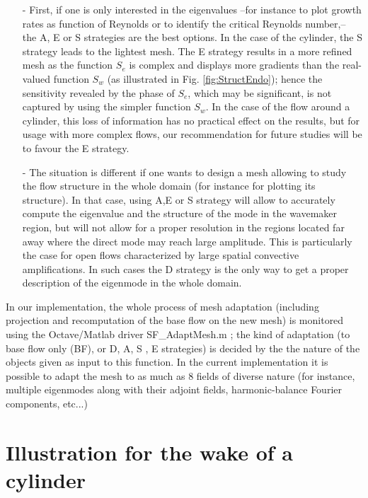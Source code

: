 \documentclass[twocolumn,10pt]{asme2ej}
\begin{document}
\begin{itemize}
\item[-] 
First, if one is only interested in the eigenvalues --for instance to plot growth rates as function of Reynolds or to identify the critical Reynolds number,-- the A, E or S strategies are the best options. In the case of the cylinder, the S strategy leads to the lightest mesh. The E strategy results in a more refined mesh as the function $S_e$ is complex and displays more gradients than the real-valued function $S_w$ (as illustrated in Fig. \ref{fig:StructEndo}); hence the sensitivity revealed by the phase of $S_e$, which may be significant, is not captured by using the simpler function $S_w$. In the case of the flow around a cylinder,  this loss of information has no practical effect on the results, but for usage with more complex flows, our recommendation for future studies will be to favour the E strategy.
\item[-] 
The situation is different if one wants to design a mesh allowing to study the flow structure in the whole domain (for instance for plotting its structure). In that case, using A,E or S strategy will allow to accurately compute the eigenvalue and the structure of the mode in the wavemaker region, but will not allow for a proper resolution in the regions located far away where the direct mode may reach large amplitude. This is particularly the case for open flows characterized by large spatial convective amplifications. In such cases the D strategy is the only way to get a proper description of the eigenmode in the whole domain.
\end{itemize}

In our implementation, the whole process of mesh adaptation (including projection and recomputation of the base flow on the new mesh) is monitored using the Octave/Matlab driver {\sf  SF\_AdaptMesh.m} ; the kind of adaptation  (to base flow only (BF), or D, A, S , E strategies) is decided by the the nature of the objects given as input to this function. In the current implementation it is possible to adapt the mesh to as much as 8 fields of diverse nature (for instance, multiple eigenmodes along with their adjoint fields, harmonic-balance Fourier components, etc...)


\section{Illustration for the wake of a cylinder} 
\vspace{.2cm}
\end{document}
